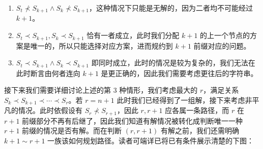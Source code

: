 \documentclass[12pt]{ctexart}
\begin{document}
\begin{enumerate}
\item $S_t \nprec S_{k+1} \wedge S_k \nprec S_{k+1}$，这种情况下只能是无解的，因为二者均不可能经过 $k+1$。
\item $S_t \prec S_{k+1}, S_k \prec S_{k+1}$ 恰有一者成立，此时我们分配 $k+1$ 的上一个节点的方案是唯一的，所以只能选择对应方案，进而规约到 $k+1$ 前缀对应的问题。
\item $S_t \prec S_{k+1} \wedge S_k\prec S_{k+1}$ 即同时成立，此时的情况是较为复杂的，我们无法在此时断言由何者连向 $k+1$ 是更正确的，因此我们需要考虑更往后的字符串。
\end{enumerate}

接下来我们需要详细讨论上述的第 3 种情形，我们考虑最大的 $r$，满足关系 $S_k \prec S_{k+1}\prec \cdots \prec S_r$。若 $r=n+1$ 此时我们已经得到了一组解，接下来考虑非平凡的情况。此时依假设有 $S_r \nprec S_{r+1}$，因此 $r,r+1$ 应各属一条路径，而 $r$ 在 $r+1$ 前缀部分不再有后继了，因此我们知道有解情况被转化成判断唯一一种 $r+1$ 前缀的情况是否有解。而在判断 $(r,r+1)$ 有解之前，我们还需明确 $k+1 \sim r+1$ 一族该如何规划路径。读者可端详已将已有条件展示清楚的下图：

\begin{center}
\end{center}
\end{document}
